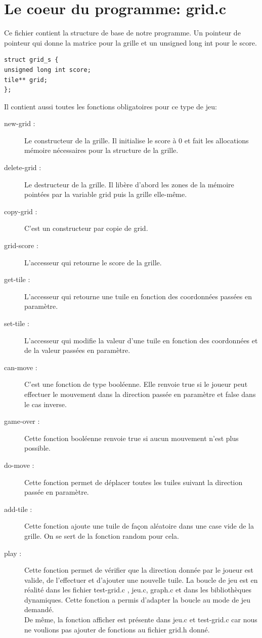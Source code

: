 \documentclass{report}
\begin{document}
\section{Le coeur du programme: grid.c}
Ce fichier contient la structure de base de notre programme. Un pointeur de pointeur qui donne la matrice pour la grille et un unsigned long int pour le score.
\begin{lstlisting}[frame=single]
struct grid_s {
unsigned long int score;
tile** grid;
};
\end{lstlisting}

Il contient aussi toutes les fonctions obligatoires pour ce type de jeu:\\

\begin{description}
\item [new-grid :] Le constructeur de la grille. Il initialise le score à 0 et fait les allocations mémoire nécessaires pour la structure de la grille.
\item [delete-grid :] Le destructeur de la grille. Il libère d'abord les zones de la mémoire pointées par la variable grid puis la grille elle-même.
\item [copy-grid :] C'est un constructeur par copie de grid.
\item [grid-score :] L'accesseur qui retourne le score de la grille.
\item [get-tile :]  L'accesseur qui retourne une tuile en fonction des coordonnées passées en paramètre.
\item [set-tile :] L'accesseur qui modifie la valeur d'une tuile en fonction des coordonnées et de la valeur passées en paramètre.
\item [can-move :] C'est une fonction de type booléenne. Elle renvoie true si le joueur peut effectuer le mouvement dans la direction passée en paramètre et false dans le cas inverse.
\item [game-over :] Cette fonction booléenne renvoie true si aucun mouvement n'est plus possible.
\item [do-move :]Cette fonction permet de déplacer toutes les tuiles suivant la direction passée en paramètre.
\item [add-tile :] Cette fonction ajoute une tuile de façon aléatoire dans une case vide de la grille. On se sert de la fonction random pour cela.
\item [play :]Cette fonction permet de vérifier que la direction donnée par le joueur est valide, de l'effectuer et d'ajouter une nouvelle tuile. La boucle de jeu est en réalité dans les fichier test-grid.c , jeu.c, graph.c et dans les bibliothèques dynamiques. Cette fonction a permis d'adapter la boucle au mode de jeu demandé.\\ De même, la fonction afficher est présente dans jeu.c et test-grid.c car nous ne voulions pas ajouter de fonctions au fichier grid.h donné.
\end{description}
\end{document}
